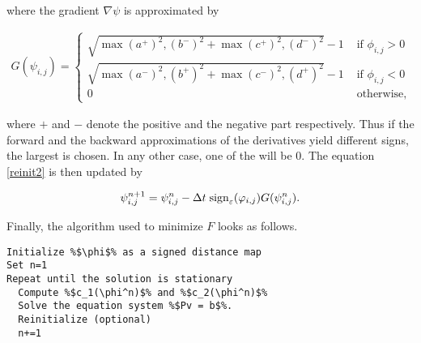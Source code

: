 where the gradient $\nabla \psi$ is approximated by 

\begin{align}
  G(\psi_{i,j}) = \begin{cases}
    \sqrt{\max{(a^+)^2,(b^-)^2}+\max{(c^+)^2,(d^-)^2}}-1 & \mbox{ if } \phi_{i,j}>0\\
    \sqrt{\max{(a^-)^2,(b^+)^2}+\max{(c^-)^2,(d^+)^2}}-1 & \mbox{ if } \phi_{i,j}<0\\
    0 &\mbox{ otherwise,}
  \end{cases}
\end{align}

where $+$ and $-$ denote the positive and the negative part respectively. Thus if the forward and the backward approximations of the derivatives yield different signs, the largest is chosen. In any other case, one of the will be 0. The equation \eqref{reinit2} is then updated by 

\begin{equation}
\psi_{i,j}^{n+1}=\psi_{i,j}^n - \Delta t \;{\rm sign}_\varepsilon(\varphi_{i,j})G(\psi_{i,j}^n).
\end{equation}\vline

Finally, the algorithm used to minimize $F$ looks as follows.

\begin{lstlisting}
Initialize %$\phi$% as a signed distance map
Set n=1
Repeat until the solution is stationary
  Compute %$c_1(\phi^n)$% and %$c_2(\phi^n)$%
  Solve the equation system %$Pv = b$%.
  Reinitialize (optional)
  n+=1
\end{lstlisting}
